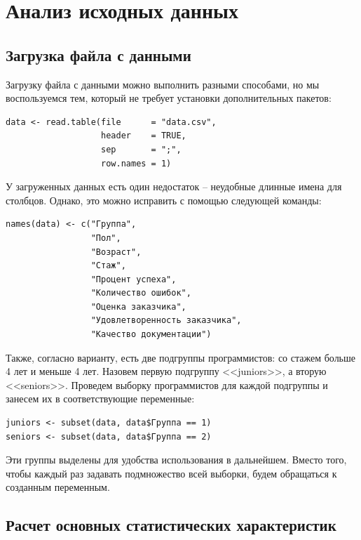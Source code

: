 \chapter{Анализ исходных данных}

\section{Загрузка файла с данными}

Загрузку файла с данными можно выполнить разными способами, но мы воспользуемся тем, который не требует установки дополнительных пакетов:

\begin{verbatim}
data <- read.table(file      = "data.csv",
                   header    = TRUE,
                   sep       = ";",
                   row.names = 1)
\end{verbatim}

У загруженных данных есть один недостаток -- неудобные длинные имена для столбцов. Однако, это можно исправить с помощью следующей команды:

\begin{verbatim}
names(data) <- c("Группа",
                 "Пол",
                 "Возраст",
                 "Стаж",
                 "Процент успеха",
                 "Количество ошибок",
                 "Оценка заказчика",
                 "Удовлетворенность заказчика",
                 "Качество документации")
\end{verbatim}

Также, согласно варианту, есть две подгруппы программистов: со стажем больше 4 лет и меньше 4 лет. Назовем первую подгруппу <<juniors>>, а вторую <<seniors>>. Проведем выборку программистов для каждой подгруппы и занесем их в соответствующие переменные:

\begin{verbatim}
juniors <- subset(data, data$Группа == 1)
seniors <- subset(data, data$Группа == 2)
\end{verbatim}

Эти группы выделены для удобства использования в дальнейшем. Вместо того, чтобы каждый раз задавать подмножество всей выборки, будем обращаться к созданным переменным.


\section{Расчет основных статистических характеристик}

